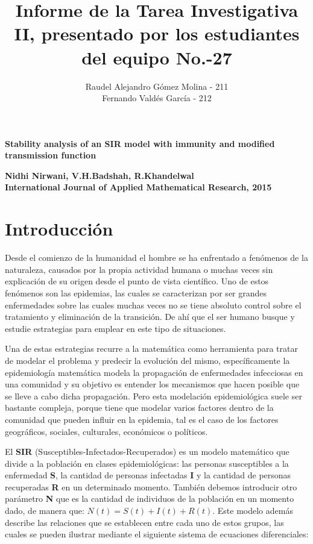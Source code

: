 \documentclass{article}
\title{Informe de la Tarea Investigativa II, presentado por los estudiantes del equipo No.-27}
\author{Raudel Alejandro G\'omez Molina - 211 \\ Fernando Vald\'es Garc\'ia - 212}
\date{}
\begin{document}
    \maketitle

    \begin{center}
        
        \LARGE{\textbf{Stability analysis of an SIR model with immunity and modified transmission function}} \par \bigskip
        \normalsize
        \Large{\textbf{Nidhi Nirwani, V.H.Badshah, R.Khandelwal}}  \\ \bigskip
        \textbf{International Journal of Applied Mathematical Research, 2015}
    \end{center}

    \pagebreak

    \section{Introducción}
    
    Desde el comienzo de la humanidad el hombre se ha enfrentado a fenómenos de la naturaleza, causados por la propia actividad humana o muchas veces sin explicación de su origen desde el punto de vista científico. Uno de estos fenómenos son las epidemias, las cuales se caracterizan por ser grandes enfermedades sobre las cuales muchas veces no se tiene absoluto control sobre el tratamiento y eliminación de la transición. De ahí que el ser humano busque y estudie estrategias para emplear en este tipo de situaciones.
    
    Una de estas estrategias recurre a la matemática como herramienta para tratar de modelar el problema y predecir la evolución del mismo, específicamente la epidemiología matemática modela la propagación de enfermedades infecciosas en una comunidad y su objetivo es entender los mecanismos que hacen posible que se lleve a cabo dicha propagación. Pero esta modelación epidemiológica suele ser bastante compleja, porque tiene que modelar varios factores dentro de la comunidad que pueden influir en la epidemia, tal es el caso de los factores geográficos, sociales, culturales, económicos o políticos.
    
    El \textbf{SIR} (Susceptibles-Infectados-Recuperados) es un modelo matemático que divide a la población en clases epidemiológicas: las personas susceptibles a la enfermedad \textbf{S}, la cantidad de personas infectadas \textbf{I} y la cantidad de personas recuperadas \textbf{R} en un determinado momento. También debemos introducir otro parámetro \textbf{N} que es la cantidad de individuos de la población en un momento dado, de manera que: $N(t)=S(t)+I(t)+R(t)$. Este modelo además describe las relaciones que se establecen entre cada uno de estos grupos, las cuales se pueden ilustrar mediante el siguiente sistema de ecuaciones diferenciales:
       
\end{document}
